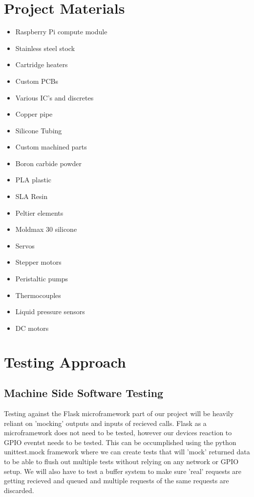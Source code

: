 \documentclass[conference]{IEEEtran}
\begin{document}
\section{Project Materials}
\begin{itemize}
\item Raspberry Pi compute module
\item Stainless steel stock
\item Cartridge heaters
\item Custom PCBs
\item Various IC's and discretes %
\item Copper pipe
\item Silicone Tubing
\item Custom machined parts
\item Boron carbide powder
\item PLA plastic
\item SLA Resin
\item Peltier elements
\item Moldmax 30 silicone
\item Servos
\item Stepper motors
\item Peristaltic pumps
\item Thermocouples
\item Liquid pressure sensors
\item DC motors
\end{itemize}


\section{Testing Approach}

\subsection{Machine Side Software Testing}
Testing against the Flask microframework part of our project will be heavily reliant on 'mocking'
outputs and inputs of recieved calls. Flask as a microframework does not need to be tested, however
our devices reaction to GPIO eventst needs to be tested. This can be occumplished using the python
unittest.mock framework  \cite{mock} where we can create tests that will 'mock' returned data to
be able to flush out multiple tests without relying on any network or GPIO setup. We will also have to 
test a buffer system to make sure 'real' requests are getting recieved and queued and multiple requests
of the same requests are discarded.
\end{document}
